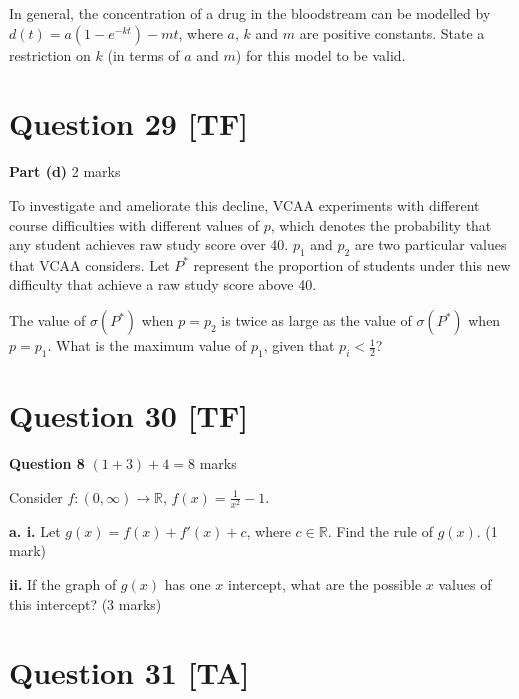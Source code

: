 \documentclass[10pt,a4paper]{article}
\begin{document}
In general, the concentration of a drug in the bloodstream can be modelled by $d(t) = a(1 - e^{-kt}) - mt$, where $a$, $k$ and $m$ are positive constants. State a restriction on $k$ (in terms of $a$ and $m$) for this model to be valid.

\vspace{9\baselineskip}

\hrulefill

\section*{Question 29 [TF]}

\textbf{Part (d)} \hfill 2 marks

To investigate and ameliorate this decline, VCAA experiments with different course difficulties with different values of $p$, which denotes the probability that any student achieves raw study score over 40. $p_1$ and $p_2$ are two particular values that VCAA considers. Let $P^*$ represent the proportion of students under this new difficulty that achieve a raw study score above 40.

The value of $\sigma(P^*)$ when $p = p_2$ is twice as large as the value of $\sigma(P^*)$ when $p = p_1$. What is the maximum value of $p_1$, given that $p_i < \frac{1}{2}$?

\vspace{9\baselineskip}

\hrulefill

\section*{Question 30 [TF]}

\textbf{Question 8} \hfill $(1+3)+4 = 8$ marks

Consider $f : (0,\infty) \to \mathbb{R}$, $f(x) = \frac{1}{x^2} - 1$.

\textbf{a. i.} Let $g(x) = f(x) + f'(x) + c$, where $c \in \mathbb{R}$. Find the rule of $g(x)$. \hfill (1 mark)

\vspace{9\baselineskip}

\textbf{ii.} If the graph of $g(x)$ has one $x$ intercept, what are the possible $x$ values of this intercept? \hfill (3 marks)

\vspace{9\baselineskip}

\hrulefill

\section*{Question 31 [TA]}
\end{document}
